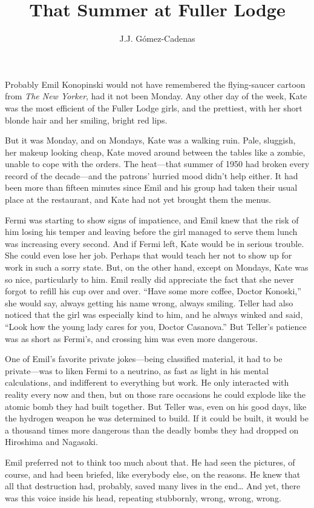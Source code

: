 \documentclass[11pt,a4paper]{article}
\title{That Summer at Fuller Lodge}
\author{J.J. Gómez-Cadenas}
\date{}
\begin{document}
\maketitle


Probably Emil Konopinski would not have remembered the flying-saucer cartoon from \emph{The New Yorker}, had it not been Monday. Any other day of the week, Kate was the most efficient of the Fuller Lodge girls, and the prettiest, with her short blonde hair and her smiling, bright red lips.

But it was Monday, and on Mondays, Kate was a walking ruin. Pale, sluggish, her makeup looking cheap, Kate moved around between the tables like a zombie, unable to cope with the orders. The heat---that summer of 1950 had broken every record of the decade---and the patrons’ hurried mood didn’t help either. It had been more than fifteen minutes since Emil and his group had taken their usual place at the restaurant, and Kate had not yet brought them the menus.

Fermi was starting to show signs of impatience, and Emil knew that the risk of him losing his temper and leaving before the girl managed to serve them lunch was increasing every second. And if Fermi left, Kate would be in serious trouble. She could even lose her job. Perhaps that would teach her not to show up for work in such a sorry state. But, on the other hand, except on Mondays, Kate was so nice, particularly to him. Emil really did appreciate the fact that she never forgot to refill his cup over and over. “Have some more coffee, Doctor Konoski,” she would say, always getting his name wrong, always smiling. Teller had also noticed that the girl was especially kind to him, and he always winked and said, “Look how the young lady cares for you, Doctor Casanova.” But Teller’s patience was as short as Fermi’s, and crossing him was even more dangerous.

One of Emil’s favorite private jokes---being classified material, it had to be private---was to liken Fermi to a neutrino, as fast as light in his mental calculations, and indifferent to everything but work. He only interacted with reality every now and then, but on those rare occasions he could explode like the atomic bomb they had built together. But Teller was, even on his good days, like the hydrogen weapon he was determined to build. If it could be built, it would be a thousand times more dangerous than the deadly bombs they had dropped on Hiroshima and Nagasaki.

Emil preferred not to think too much about that. He had seen the pictures, of course, and had been briefed, like everybody else, on the reasons. He knew that all that destruction had, probably, saved many lives in the end… And yet, there was this voice inside his head, repeating stubbornly, wrong, wrong, wrong.
\end{document}
